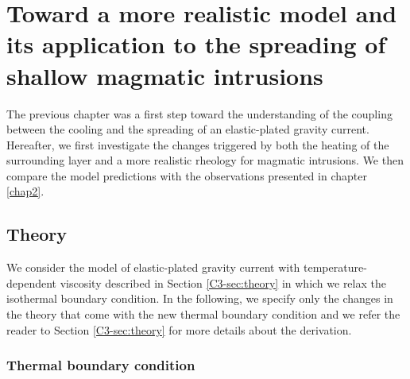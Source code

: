 
\chapter{Toward  a more  realistic model  and its  application to  the
  spreading of shallow magmatic intrusions}
\label{Heating}

\minitoc

The previous chapter was a first step toward the understanding of the
coupling between  the cooling and  the spreading of  an elastic-plated
gravity current. Hereafter, we first investigate the changes triggered
by both  the heating  of the  surrounding layer  and a  more realistic
rheology for magmatic intrusions. We then compare the model predictions with the observations
presented in chapter \ref{chap2}.

\section{Theory}
\label{C4-sec:theory-1}

We  consider   the  model  of  elastic-plated   gravity  current  with
temperature-dependent      viscosity     described      in     Section
\ref{C3-sec:theory}  in   which  we  relax  the   isothermal  boundary
condition. In the following, we specify only the changes in the theory
that come  with the new  thermal boundary  condition and we  refer the
reader  to  Section \ref{C3-sec:theory}  for  more  details about  the
derivation.

\subsection{Thermal boundary condition}
\label{C4-sec:formulation-1}

